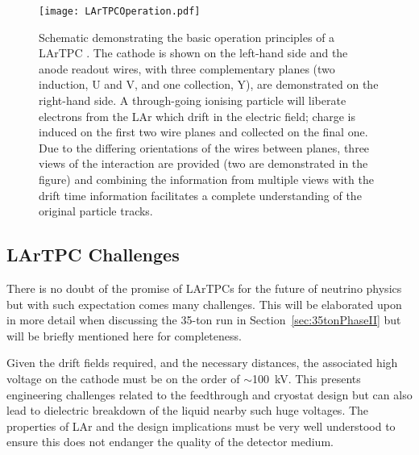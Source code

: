 \begin{figure}
  \centering
  \texttt{[image: LArTPCOperation.pdf]}
  \caption[Schematic demonstrating the basic operation principles of a LArTPC.]{Schematic demonstrating the basic operation principles of a LArTPC \cite{MicroBooNENoise2017}.  The cathode is shown on the left-hand side and the anode readout wires, with three complementary planes (two induction, U and V, and one collection, Y), are demonstrated on the right-hand side.  A through-going ionising particle will liberate electrons from the LAr which drift in the electric field; charge is induced on the first two wire planes and collected on the final one.  Due to the differing orientations of the wires between planes, three views of the interaction are provided (two are demonstrated in the figure) and combining the information from multiple views with the drift time information facilitates a complete understanding of the original particle tracks.}
  \label{fig:LArTPCOperation}
\end{figure}

\subsection{LArTPC Challenges}\label{sec:LArTPCChallenges}

There is no doubt of the promise of LArTPCs for the future of neutrino physics but with such expectation comes many challenges.  This will be elaborated upon in more detail when discussing the 35-ton run in Section~\ref{sec:35tonPhaseII} but will be briefly mentioned here for completeness.

Given the drift fields required, and the necessary distances, the associated high voltage on the cathode must be on the order of $\sim$100~kV.  This presents engineering challenges related to the feedthrough and cryostat design but can also lead to dielectric breakdown of the liquid nearby such huge voltages.  The properties of LAr and the design implications must be very well understood to ensure this does not endanger the quality of the detector medium.

